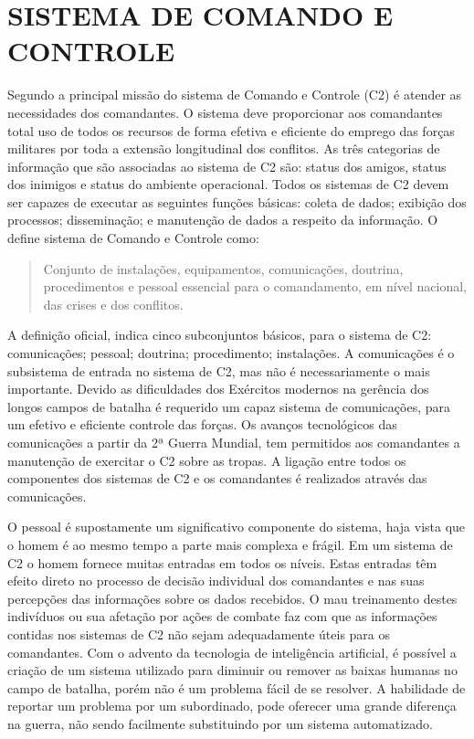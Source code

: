 \chapter{SISTEMA DE COMANDO E CONTROLE}
Segundo \cite{thesecommandandcontrol} a  principal missão do sistema de Comando e Controle (C2) é atender as necessidades dos comandantes. O sistema deve proporcionar aos comandantes total uso de todos os recursos de forma efetiva e eficiente do emprego das forças militares por toda a extensão longitudinal dos conflitos. As três categorias de informação que são associadas ao sistema de C2 são: status dos amigos, status dos inimigos e status do ambiente operacional. Todos os sistemas de C2 devem ser capazes de executar as seguintes funções básicas: coleta de dados; exibição dos processos; disseminação; e manutenção de dados a respeito da informação. O \cite{comandoecontrole2015} define sistema de Comando e Controle como: 
\begin{quote}
    Conjunto de instalações, equipamentos, comunicações, doutrina, procedimentos e pessoal essencial para o comandamento, em nível nacional, das crises e dos conflitos.
\end{quote}

A definição oficial, indica cinco subconjuntos básicos, para o sistema de C2: comunicações; pessoal;  doutrina; procedimento; instalações. A comunicações é o subsistema de entrada no sistema de C2, mas não é necessariamente o mais importante. Devido as  dificuldades dos Exércitos modernos na gerência dos longos campos de batalha é requerido um capaz sistema de comunicações, para um efetivo e eficiente controle das forças. Os avanços tecnológicos das comunicações a partir da 2ª Guerra Mundial, tem permitidos aos comandantes a manutenção de exercitar o C2 sobre as tropas. A ligação entre todos os componentes dos sistemas de C2 e os comandantes é realizados através das comunicações.

O pessoal é supostamente um significativo componente do sistema, haja vista que o homem é ao mesmo tempo a parte mais complexa e frágil. Em um sistema de C2 o homem fornece muitas entradas em todos os níveis. Estas entradas têm efeito direto no processo de decisão individual dos comandantes e nas suas percepções das informações  sobre os dados recebidos. O mau treinamento destes indivíduos ou sua afetação por ações de combate faz com que as informações contidas nos sistemas de C2 não sejam adequadamente úteis para os comandantes. Com o advento da tecnologia de inteligência artificial, é possível a criação de um sistema utilizado para diminuir ou remover as baixas humanas no campo de batalha, porém não é um problema fácil de se resolver. A habilidade de reportar um problema por um subordinado, pode oferecer uma grande diferença na guerra, não sendo facilmente substituindo por um sistema automatizado.

